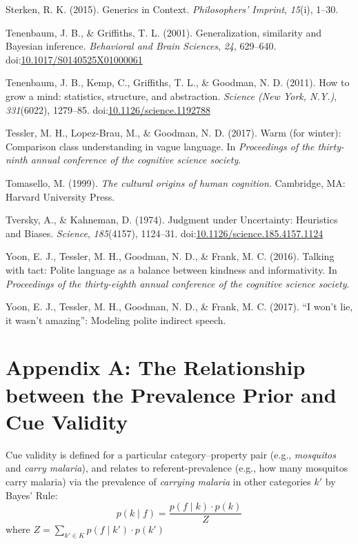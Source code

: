 \documentclass[english,floatsintext,man]{apa6}
\theoremstyle{definition}
\theoremstyle{definition}
\theoremstyle{definition}
\theoremstyle{remark}
\begin{document}
\hypertarget{ref-Sterken2015}{}
Sterken, R. K. (2015). Generics in Context. \emph{Philosophers'
Imprint}, \emph{15}(i), 1--30.

\hypertarget{ref-Tenenbaum2001}{}
Tenenbaum, J. B., \& Griffiths, T. L. (2001). Generalization, similarity
and Bayesian inference. \emph{Behavioral and Brain Sciences}, \emph{24},
629--640.
doi:\href{https://doi.org/10.1017/S0140525X01000061}{10.1017/S0140525X01000061}

\hypertarget{ref-Tenenbaum2011}{}
Tenenbaum, J. B., Kemp, C., Griffiths, T. L., \& Goodman, N. D. (2011).
How to grow a mind: statistics, structure, and abstraction.
\emph{Science (New York, N.Y.)}, \emph{331}(6022), 1279--85.
doi:\href{https://doi.org/10.1126/science.1192788}{10.1126/science.1192788}

\hypertarget{ref-Tessler2017}{}
Tessler, M. H., Lopez-Brau, M., \& Goodman, N. D. (2017). Warm (for
winter): Comparison class understanding in vague language. In
\emph{Proceedings of the thirty-ninth annual conference of the cognitive
science society}.

\hypertarget{ref-Tomasello1999}{}
Tomasello, M. (1999). \emph{The cultural origins of human cognition}.
Cambridge, MA: Harvard University Press.

\hypertarget{ref-Tversky1974}{}
Tversky, A., \& Kahneman, D. (1974). Judgment under Uncertainty:
Heuristics and Biases. \emph{Science}, \emph{185}(4157), 1124--31.
doi:\href{https://doi.org/10.1126/science.185.4157.1124}{10.1126/science.185.4157.1124}

\hypertarget{ref-Yoon2016}{}
Yoon, E. J., Tessler, M. H., Goodman, N. D., \& Frank, M. C. (2016).
Talking with tact: Polite language as a balance between kindness and
informativity. In \emph{Proceedings of the thirty-eighth annual
conference of the cognitive science society}.

\hypertarget{ref-Yoon2017}{}
Yoon, E. J., Tessler, M. H., Goodman, N. D., \& Frank, M. C. (2017). ``I
won't lie, it wasn't amazing'': Modeling polite indirect speech.

\newpage

\section{Appendix A: The Relationship between the Prevalence Prior and
Cue
Validity}\label{appendix-a-the-relationship-between-the-prevalence-prior-and-cue-validity}

Cue validity is defined for a particular category--property pair (e.g.,
\emph{mosquitos} and \emph{carry malaria}), and relates to
referent-prevalence (e.g., how many mosquitos carry malaria) via the
prevalence of \emph{carrying malaria} in other categories \(k'\) by
Bayes' Rule: \[ p(k \mid f) = \frac{p(f \mid k) \cdot p(k)}{Z} \] where
\(Z = \sum_{k' \in K} p( f \mid k') \cdot p( k')\)
\end{document}
